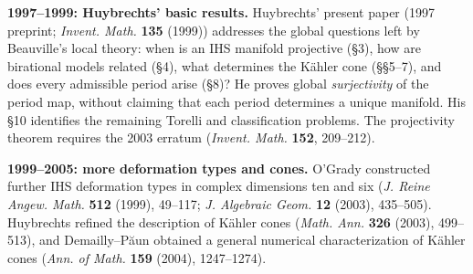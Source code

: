 \par\smallskip\noindent
\textbf{1997--1999: Huybrechts' basic results.}
Huybrechts' present paper (1997 preprint;
\emph{Invent. Math.} \textbf{135} (1999))
addresses the global questions left by
Beauville's local theory: when is an IHS
manifold projective (\S3), how are birational
models related (\S4), what determines the
K\"ahler cone (\S\S5--7), and does every
admissible period arise (\S8)?
He proves global \emph{surjectivity} of
the period map, without claiming that
each period determines a unique manifold.
His \S10 identifies the remaining Torelli
and classification problems.
The projectivity theorem requires the
2003 erratum (\emph{Invent. Math.}
\textbf{152}, 209--212).

\par\smallskip\noindent
\textbf{1999--2005: more deformation types and cones.}
O'Grady constructed further IHS deformation
types in complex dimensions ten and six
(\emph{J. Reine Angew. Math.} \textbf{512}
(1999), 49--117; \emph{J. Algebraic Geom.}
\textbf{12} (2003), 435--505).
Huybrechts refined the description of
K\"ahler cones (\emph{Math. Ann.}
\textbf{326} (2003), 499--513), and
Demailly--P\u{a}un obtained a general
numerical characterization of K\"ahler
cones (\emph{Ann. of Math.} \textbf{159}
(2004), 1247--1274).


